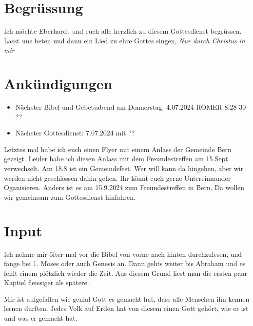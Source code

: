 

\section{Begrüssung}
Ich möchte Eberhardt und euch alle herzlich zu diesem Gottesdienst begrüssen.
\\
Lasst uns beten und dann ein Lied zu ehre Gottes singen, \textit{Nur durch Christus in mir}

\section{Ankündigungen}
\begin{itemize}
    \item Nächster Bibel und Gebetsabend am Donnerstag:
    4.07.2024  RÖMER 8,28-30    ??
    \item Nächster Gottesdienst: 7.07.2024 mit ??
\end{itemize}
Letztes mal habe ich euch einen Flyer mit einem Anlass der Gemeinde Bern gezeigt. Leider habe ich diesen Anlass mit dem Freundestreffen am 15.Sept verwechselt. Am 18.8 ist ein Gemeindefest. Wer will kann da hingehen, aber wir werden nicht geschlossen dahin gehen. Ihr könnt euch gerne Untereinnander Oganisieren. Anders ist es am 15.9.2024 zum Freundestreffen in Bern. Da wollen wir gemeinsam zum Gottesdienst hinfahren.
\section{ Input }
Ich nehme mir öfter mal vor die Bibel von vorne nach hinten durchzulesen, und fange bei 1. Moses oder auch Genesis an. Dann gehts weiter bis Abraham und es fehlt einem plötzlich wieder die Zeit. Aus diesem Grund liest man die ersten paar Kaptiel fleissiger als spätere.

Mir ist aufgefallen wie genial Gott es gemacht hat, dass alle Menschen ihn kennen lernen durften. Jedes Volk auf Erden hat von diesem einen Gott gehört, wie er ist und was er gemacht hat.

